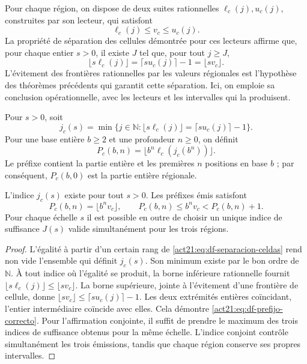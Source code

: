 Pour chaque région, on dispose de deux suites rationnelles
\(\ell_c(j),u_c(j)\), construites par son lecteur, qui satisfont
\[
 \ell_c(j)\leq v_c\leq u_c(j).
\]
La propriété de séparation des cellules démontrée pour ces lecteurs affirme
que, pour chaque entier \(s>0\), il existe \(J\) tel que, pour tout \(j\geq J\),
\begin{equation}
 \lfloor s\ell_c(j)\rfloor
 =\lceil su_c(j)\rceil-1
 =\lfloor sv_c\rfloor.
 \label{act21:eq:df-separacion-celdas}
\end{equation}
L'évitement des frontières rationnelles par les valeurs régionales est l'hypothèse des théorèmes précédents qui garantit cette séparation. Ici, on emploie sa conclusion opérationnelle, avec les lecteurs et les intervalles qui la produisent.

\begin{definition}
Pour \(s>0\), soit
\[
 j_c(s)=\min\{j\in\mathbb N:
 \lfloor s\ell_c(j)\rfloor=\lceil su_c(j)\rceil-1\}.
\]
Pour une base entière \(b\geq2\) et une profondeur \(n\geq0\), on définit
\begin{equation}
 P_c(b,n)=\lfloor b^n\ell_c(j_c(b^n))\rfloor.
 \label{act21:eq:df-publicacion-prefijo}
\end{equation}
Le préfixe contient la partie entière et les premières \(n\) positions en base \(b\) ; par conséquent, \(P_c(b,0)\) est la partie entière régionale.
\end{definition}

\begin{theorem}
\label{act21:thm:df-emision-correcta}
L'indice \(j_c(s)\) existe pour tout \(s>0\). Les préfixes émis satisfont
\begin{equation}
 P_c(b,n)=\lfloor b^n v_c\rfloor,
 \qquad
 P_c(b,n)\leq b^n v_c<P_c(b,n)+1.
 \label{act21:eq:df-prefijo-correcto}
\end{equation}
Pour chaque échelle \(s\) il est possible en outre de choisir un unique indice de suffisance \(J(s)\) valide simultanément pour les trois régions.
\end{theorem}

\begin{proof}
L'égalité à partir d'un certain rang de \eqref{act21:eq:df-separacion-celdas} rend non vide
l'ensemble qui définit \(j_c(s)\). Son minimum existe par le bon ordre de
\(\mathbb N\). À tout indice où l'égalité se produit, la borne
inférieure rationnelle fournit
\(\lfloor s\ell_c(j)\rfloor\leq\lfloor sv_c\rfloor\).
La borne supérieure, jointe à l'évitement d'une frontière de cellule, donne
\(\lfloor sv_c\rfloor\leq\lceil su_c(j)\rceil-1\).
Les deux extrémités entières coïncidant, l'entier intermédiaire coïncide avec
elles. Cela démontre \eqref{act21:eq:df-prefijo-correcto}. Pour l'affirmation
conjointe, il suffit de prendre le maximum des trois indices de suffisance obtenus
pour la même échelle. L'indice conjoint contrôle simultanément les trois
émissions, tandis que chaque région conserve ses propres intervalles.
\end{proof}

